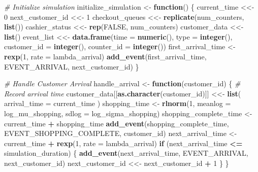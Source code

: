 \documentclass[
]{article}
\newenvironment{Shaded}{\begin{snugshade}}{\end{snugshade}}
\newcommand{\AttributeTok}[1]{\textcolor[rgb]{0.13,0.29,0.53}{#1}}
\newcommand{\CommentTok}[1]{\textcolor[rgb]{0.56,0.35,0.01}{\textit{#1}}}
\newcommand{\ConstantTok}[1]{\textcolor[rgb]{0.56,0.35,0.01}{#1}}
\newcommand{\ControlFlowTok}[1]{\textcolor[rgb]{0.13,0.29,0.53}{\textbf{#1}}}
\newcommand{\DecValTok}[1]{\textcolor[rgb]{0.00,0.00,0.81}{#1}}
\newcommand{\FunctionTok}[1]{\textcolor[rgb]{0.13,0.29,0.53}{\textbf{#1}}}
\newcommand{\NormalTok}[1]{#1}
\newcommand{\OtherTok}[1]{\textcolor[rgb]{0.56,0.35,0.01}{#1}}
\newcommand{\SpecialCharTok}[1]{\textcolor[rgb]{0.81,0.36,0.00}{\textbf{#1}}}
\begin{document}
\begin{Shaded}
\begin{Highlighting}[]
\CommentTok{\# Initialize simulation}
\NormalTok{initialize\_simulation }\OtherTok{\textless{}{-}} \ControlFlowTok{function}\NormalTok{() \{}
\NormalTok{  current\_time }\OtherTok{\textless{}\textless{}{-}} \DecValTok{0}
\NormalTok{  next\_customer\_id }\OtherTok{\textless{}\textless{}{-}} \DecValTok{1}
\NormalTok{  checkout\_queues }\OtherTok{\textless{}\textless{}{-}} \FunctionTok{replicate}\NormalTok{(num\_counters, }\FunctionTok{list}\NormalTok{())}
\NormalTok{  cashier\_status }\OtherTok{\textless{}\textless{}{-}} \FunctionTok{rep}\NormalTok{(}\ConstantTok{FALSE}\NormalTok{, num\_counters)}
\NormalTok{  customer\_data }\OtherTok{\textless{}\textless{}{-}} \FunctionTok{list}\NormalTok{()}
\NormalTok{  event\_list }\OtherTok{\textless{}\textless{}{-}} \FunctionTok{data.frame}\NormalTok{(}\AttributeTok{time =} \FunctionTok{numeric}\NormalTok{(), }\AttributeTok{type =} \FunctionTok{integer}\NormalTok{(), }
                           \AttributeTok{customer\_id =} \FunctionTok{integer}\NormalTok{(), }\AttributeTok{counter\_id =} \FunctionTok{integer}\NormalTok{())}
\NormalTok{  first\_arrival\_time }\OtherTok{\textless{}{-}} \FunctionTok{rexp}\NormalTok{(}\DecValTok{1}\NormalTok{, }\AttributeTok{rate =}\NormalTok{ lambda\_arrival)}
  \FunctionTok{add\_event}\NormalTok{(first\_arrival\_time, EVENT\_ARRIVAL, next\_customer\_id)}
\NormalTok{\}}

\CommentTok{\# Handle Customer Arrival}
\NormalTok{handle\_arrival }\OtherTok{\textless{}{-}} \ControlFlowTok{function}\NormalTok{(customer\_id) \{}
  \CommentTok{\# Record arrival time}
\NormalTok{  customer\_data[[}\FunctionTok{as.character}\NormalTok{(customer\_id)]] }\OtherTok{\textless{}\textless{}{-}} \FunctionTok{list}\NormalTok{(}
    \AttributeTok{arrival\_time =}\NormalTok{ current\_time}
\NormalTok{  )}
\NormalTok{  shopping\_time }\OtherTok{\textless{}{-}} \FunctionTok{rlnorm}\NormalTok{(}\DecValTok{1}\NormalTok{, }\AttributeTok{meanlog =}\NormalTok{ log\_mu\_shopping, }\AttributeTok{sdlog =}\NormalTok{ log\_sigma\_shopping)}
\NormalTok{  shopping\_complete\_time }\OtherTok{\textless{}{-}}\NormalTok{ current\_time }\SpecialCharTok{+}\NormalTok{ shopping\_time}
  \FunctionTok{add\_event}\NormalTok{(shopping\_complete\_time, EVENT\_SHOPPING\_COMPLETE, customer\_id)}
\NormalTok{  next\_arrival\_time }\OtherTok{\textless{}{-}}\NormalTok{ current\_time }\SpecialCharTok{+} \FunctionTok{rexp}\NormalTok{(}\DecValTok{1}\NormalTok{, }\AttributeTok{rate =}\NormalTok{ lambda\_arrival)}
  \ControlFlowTok{if}\NormalTok{ (next\_arrival\_time }\SpecialCharTok{\textless{}=}\NormalTok{ simulation\_duration) \{}
    \FunctionTok{add\_event}\NormalTok{(next\_arrival\_time, EVENT\_ARRIVAL, next\_customer\_id)}
\NormalTok{    next\_customer\_id }\OtherTok{\textless{}\textless{}{-}}\NormalTok{ next\_customer\_id }\SpecialCharTok{+} \DecValTok{1}
\NormalTok{  \}}
\NormalTok{\}}


\end{Highlighting}
\end{Shaded}
\end{document}
